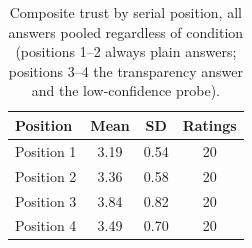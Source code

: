 \begin{table}[H]
\centering
\caption{Composite trust by serial position, all answers pooled regardless of condition (positions 1--2 always plain answers; positions 3--4 the transparency answer and the low-confidence probe).}
\label{tab:us-order}
{\footnotesize{}\setlength{\tabcolsep}{4pt}
\begin{tabular}{lccc}
\toprule
\textbf{Position} & \textbf{Mean} & \textbf{SD} & \textbf{Ratings} \\
\midrule
Position 1 & 3.19 & 0.54 & 20 \\
Position 2 & 3.36 & 0.58 & 20 \\
Position 3 & 3.84 & 0.82 & 20 \\
Position 4 & 3.49 & 0.70 & 20 \\
\bottomrule
\end{tabular}
}
\end{table}
